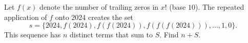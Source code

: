 Let $f(x)$ denote the number of trailing zeros in $x!$ (base $10$). The repeated application of $f$ onto 2024 creates the set \[s = \{2024, f(2024), f(f(2024)), f(f(f(2024))), ..., 1, 0\}.\]This sequence has $n$ distinct terms that sum to $S$. Find $n + S$.
